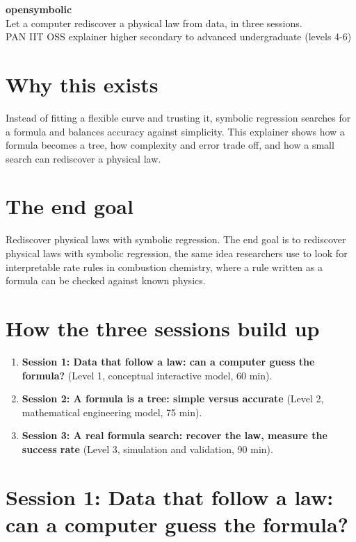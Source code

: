 \documentclass[11pt,a4paper]{article}
\begin{document}
\begin{center}{\LARGE\bfseries opensymbolic}\\[0.4em]{\large Let a computer rediscover a physical law from data, in three sessions.}\\[0.2em]\small PAN IIT OSS explainer \textbullet{} higher secondary to advanced undergraduate (levels 4-6)\end{center}

\section*{Why this exists}
Instead of fitting a flexible curve and trusting it, symbolic regression searches for a formula and balances accuracy against simplicity. This explainer shows how a formula becomes a tree, how complexity and error trade off, and how a small search can rediscover a physical law.

\section*{The end goal}
Rediscover physical laws with symbolic regression. The end goal is to rediscover physical laws with symbolic regression, the same idea researchers use to look for interpretable rate rules in combustion chemistry, where a rule written as a formula can be checked against known physics.

\section*{How the three sessions build up}
\begin{enumerate}[nosep]
\item \textbf{Session 1: Data that follow a law: can a computer guess the formula?} (Level 1, conceptual interactive model, 60 min).
\item \textbf{Session 2: A formula is a tree: simple versus accurate} (Level 2, mathematical engineering model, 75 min).
\item \textbf{Session 3: A real formula search: recover the law, measure the success rate} (Level 3, simulation and validation, 90 min).
\end{enumerate}

\section{Session 1: Data that follow a law: can a computer guess the formula?}
\end{document}
